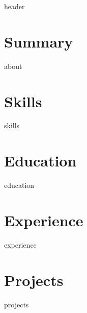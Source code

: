 \documentclass[letterpaper,11pt]{article}
\begin{document}
{header}\label{sec:header}

\section{Summary}\label{sec:about}
\vspace*{2pt}
{about}

\section{Skills}\label{sec:skills}
\vspace*{2pt}
{skills}

\section{Education}\label{sec:education}
\vspace*{2pt}
{education}

\section{Experience}\label{sec:experience}
\vspace*{8pt}
{experience}

\section{Projects}\label{sec:projects}
\vspace*{2pt}
{projects}
\end{document}
